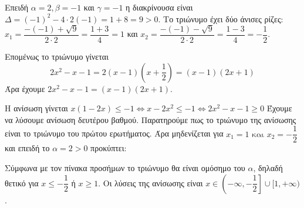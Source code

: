 
\begin{alist}
\item Επειδή $\alpha=2, \beta=-1$ και $\gamma=-1$ η διακρίνουσα είναι
$\Delta = (-1)^2 - 4 \cdot 2(-1) = 1 + 8 = 9 > 0$. Το τριώνυμο έχει δύο άνισες ρίζες:
$x_1 = \dfrac{-(-1) + \sqrt{9}}{2 \cdot 2} = \dfrac{1+3}{4} = 1$ και $x_2 = \dfrac{-(-1) - \sqrt{9}}{2 \cdot 2} = \dfrac{1-3}{4} = -\dfrac{1}{2}$.

Επομένως το τριώνυμο γίνεται
\[2x^2 - x - 1 = 2(x - 1)\left(x + \dfrac{1}{2}\right) = (x - 1)(2x + 1)\]
Άρα έχουμε $2x^2 - x - 1 = (x - 1)(2x + 1)$.

\item Η ανίσωση γίνεται $x(1 - 2x) \le -1 \Leftrightarrow x - 2x^2 \le -1 \Leftrightarrow 2x^2 - x - 1 \ge 0$
Έχουμε να λύσουμε ανίσωση δευτέρου βαθμού. Παρατηρούμε πως το τριώνυμο της ανίσωσης είναι το τριώνυμο του πρώτου
ερωτήματος. Άρα μηδενίζεται για $x_1 = 1 \text{ και } x_2 = -\dfrac{1}{2}$ και επειδή το $\alpha = 2 > 0$
προκύπτει:
\begin{center}
\end{center}
Σύμφωνα με τον πίνακα προσήμων το τριώνυμο θα είναι ομόσημο του $\alpha$, δηλαδή
θετικό για $x \le -\dfrac{1}{2}$ ή $x \ge 1$.
Οι λύσεις της ανίσωσης είναι $x \in \left(-\infty, -\dfrac{1}{2}\right] \cup [1, +\infty)$.
\end{alist}

